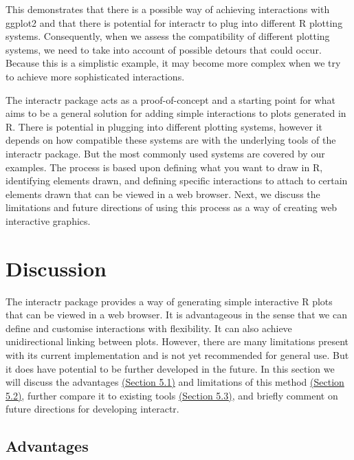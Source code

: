 \documentclass[11pt,]{report}
\begin{document}
This demonstrates that there is a possible way of achieving interactions
with \textsf{ggplot2} and that there is potential for \textsf{interactr}
to plug into different R plotting systems. Consequently, when we assess
the compatibility of different plotting systems, we need to take into
account of possible detours that could occur. Because this is a
simplistic example, it may become more complex when we try to achieve
more sophisticated interactions.

The \textsf{interactr} package acts as a proof-of-concept and a starting
point for what aims to be a general solution for adding simple
interactions to plots generated in R. There is potential in plugging
into different plotting systems, however it depends on how compatible
these systems are with the underlying tools of the \textsf{interactr}
package. But the most commonly used systems are covered by our examples.
The process is based upon defining what you want to draw in R,
identifying elements drawn, and defining specific interactions to attach
to certain elements drawn that can be viewed in a web browser. Next, we
discuss the limitations and future directions of using this process as a
way of creating web interactive graphics.

\newpage

\chapter{Discussion}\label{discussion}

The \textsf{interactr} package provides a way of generating simple
interactive R plots that can be viewed in a web browser. It is
advantageous in the sense that we can define and customise interactions
with flexibility. It can also achieve unidirectional linking between
plots. However, there are many limitations present with its current
implementation and is not yet recommended for general use. But it does
have potential to be further developed in the future. In this section we
will discuss the advantages \protect\hyperlink{advantages}{(Section
5.1)} and limitations of this method
\protect\hyperlink{limitations}{(Section 5.2)}, further compare it to
existing tools \protect\hyperlink{comparison-to-existing-tools}{(Section
5.3)}, and briefly comment on future directions for developing
\textsf{interactr}.

\hypertarget{advantages}{\section{Advantages}\label{advantages}}
\end{document}
